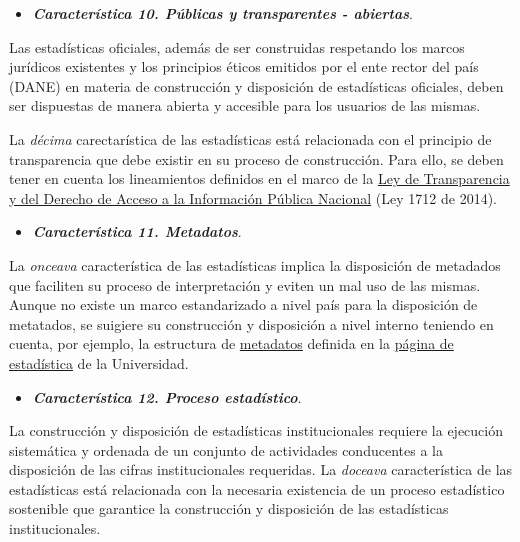 \documentclass[
]{book}
\providecommand{\tightlist}{%
  \setlength{\itemsep}{0pt}\setlength{\parskip}{0pt}}
\begin{document}
\begin{itemize}
\tightlist
\item
  \textbf{\emph{Característica 10. Públicas y transparentes - abiertas}}.
\end{itemize}

Las estadísticas oficiales, además de ser construidas respetando los marcos jurídicos existentes y los principios éticos emitidos por el ente rector del país (DANE) en materia de construcción y disposición de estadísticas oficiales, deben ser dispuestas de manera abierta y accesible para los usuarios de las mismas.

La \emph{décima} carectarística de las estadísticas está relacionada con el principio de transparencia que debe existir en su proceso de construcción. Para ello, se deben tener en cuenta los lineamientos definidos en el marco de la \href{https://www.funcionpublica.gov.co/eva/gestornormativo/norma.php?i=56882}{Ley de Transparencia y del Derecho de Acceso a la Información Pública Nacional} (Ley 1712 de 2014).

\begin{itemize}
\tightlist
\item
  \textbf{\emph{Característica 11. Metadatos}}.
\end{itemize}

La \emph{onceava} característica de las estadísticas implica la disposición de metadados que faciliten su proceso de interpretación y eviten un mal uso de las mismas. Aunque no existe un marco estandarizado a nivel país para la disposición de metatados, se suigiere su construcción y disposición a nivel interno teniendo en cuenta, por ejemplo, la estructura de \href{http://estadisticas.unal.edu.co/menu-principal/cifras-generales/metadatos/}{metadatos} definida en la \href{http://estadisticas.unal.edu.co/home/}{página de estadística} de la Universidad.

\begin{itemize}
\tightlist
\item
  \textbf{\emph{Característica 12. Proceso estadístico}}.
\end{itemize}

La construcción y disposición de estadísticas institucionales requiere la ejecución sistemática y ordenada de un conjunto de actividades conducentes a la disposición de las cifras institucionales requeridas. La \emph{doceava} característica de las estadísticas está relacionada con la necesaria existencia de un proceso estadístico sostenible que garantice la construcción y disposición de las estadísticas institucionales.
\end{document}
